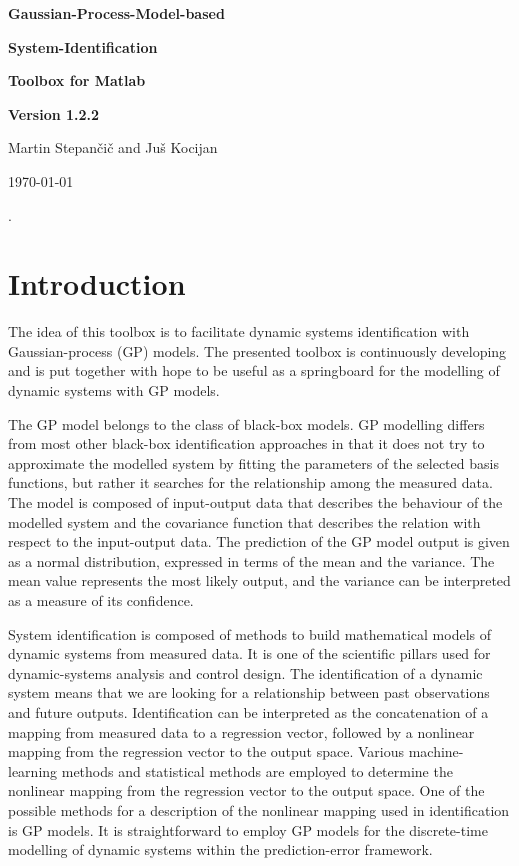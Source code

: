 \documentclass[12pt,twoside]{article}
\begin{document}
\thispagestyle{empty}
\vspace{3cm}

\vspace{4cm}
 \centerline{\Huge\bf Gaussian-Process-Model-based}
  \vspace{4mm}
 \centerline{\Huge\bf  System-Identification}
  \vspace{4mm}
\centerline{\Huge\bf  Toolbox for Matlab}
 \vspace{4mm}
 \centerline{\Huge\bf  Version 1.2.2}
 \vspace{3mm}
\vspace{3cm}
\begin{center}{\Large Martin Stepan\v ci\v c and Ju\v s Kocijan} \end{center}

  \vfill \centerline{\Large \today}
\pagebreak\setcounter{page}{1}
\newpage


\newpage
\thispagestyle{empty} .\newpage {}
\setcounter{page}{1}

\section{Introduction}

The idea of this toolbox is to facilitate dynamic systems
identification with Gaussian-process (GP) models. The presented toolbox is continuously developing and is put together with hope to be useful
as a springboard for the modelling of dynamic systems with GP models.

The GP model belongs to the class of black-box models. GP modelling
differs from most other black-box identification approaches in that it does
not try to approximate the modelled system by fitting the parameters of the
selected basis functions, but rather it searches for the relationship among the measured data. The model is composed of input-output data that describes
the behaviour of the modelled system and the covariance function that describes the relation with respect to the input-output data. The prediction of
the GP model output is given as a normal distribution, expressed in terms
of the mean and the variance. The mean value represents the most likely
output, and the variance can be interpreted as a measure of its confidence.

System identification is composed of methods to build mathematical models of dynamic systems from measured data. It is one of the scientific pillars used for dynamic-systems analysis and control design. The identification of a dynamic system means that we are looking for a relationship between past observations and future outputs. Identification can be interpreted as the concatenation of a mapping from measured data to a regression vector, followed by a nonlinear mapping from the regression vector to the output space. Various machine-learning methods and statistical methods are employed to determine the nonlinear mapping from the regression vector
to the output space. One of the possible methods for a description of the nonlinear mapping used in identification is GP models. It is straightforward to employ GP models for the discrete-time modelling of dynamic systems within the prediction-error framework.
\end{document}
